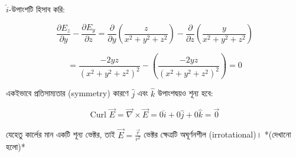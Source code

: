 \documentclass[11pt, a4paper]{article}
\begin{document}
$\hat{i}$-উপাংশটি হিসাব করি:

$$\frac{\partial E_z}{\partial y} - \frac{\partial E_y}{\partial z} = \frac{\partial}{\partial y}\left(\frac{z}{x^2+y^2+z^2}\right) - \frac{\partial}{\partial z}\left(\frac{y}{x^2+y^2+z^2}\right)$$

$$= \frac{-2yz}{(x^2+y^2+z^2)^2} - \left(\frac{-2yz}{(x^2+y^2+z^2)^2}\right) = 0$$

একইভাবে প্রতিসাম্যতার (symmetry) কারণে $\hat{j}$ এবং $\hat{k}$ উপাংশদ্বয়ও শূন্য হবে:

$$\text{Curl }\vec{E} = \vec{\nabla} \times \vec{E} = 0\hat{i} + 0\hat{j} + 0\hat{k} = \vec{0}$$

যেহেতু কার্লের মান একটি শূন্য ভেক্টর, তাই $\vec{E} = \frac{\vec{r}}{r^2}$ ভেক্টর ক্ষেত্রটি অঘূর্ণনশীল (irrotational)। *(দেখানো হলো)*

\vspace{1em}
\begin{center}
\end{center}
\end{document}
